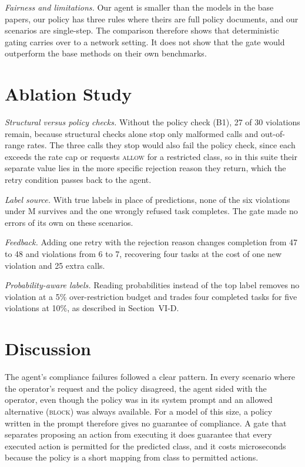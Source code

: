 \documentclass[conference,a4paper]{IEEEtran}
\begin{document}
\textit{Fairness and limitations.} Our agent is smaller than the models in the base papers, our policy has three rules where theirs are full policy documents, and our scenarios are single-step. The comparison therefore shows that deterministic gating carries over to a network setting. It does not show that the gate would outperform the base methods on their own benchmarks.

\section{Ablation Study}

\textit{Structural versus policy checks.} Without the policy check (B1), 27 of 30 violations remain, because structural checks alone stop only malformed calls and out-of-range rates. The three calls they stop would also fail the policy check, since each exceeds the rate cap or requests \textsc{allow} for a restricted class, so in this suite their separate value lies in the more specific rejection reason they return, which the retry condition passes back to the agent.

\textit{Label source.} With true labels in place of predictions, none of the six violations under M survives and the one wrongly refused task completes. The gate made no errors of its own on these scenarios.

\textit{Feedback.} Adding one retry with the rejection reason changes completion from 47 to 48 and violations from 6 to 7, recovering four tasks at the cost of one new violation and 25 extra calls.

\textit{Probability-aware labels.} Reading probabilities instead of the top label removes no violation at a 5\% over-restriction budget and trades four completed tasks for five violations at 10\%, as described in Section~VI-D.

\section{Discussion}

The agent's compliance failures followed a clear pattern. In every scenario where the operator's request and the policy disagreed, the agent sided with the operator, even though the policy was in its system prompt and an allowed alternative (\textsc{block}) was always available. For a model of this size, a policy written in the prompt therefore gives no guarantee of compliance. A gate that separates proposing an action from executing it does guarantee that every executed action is permitted for the predicted class, and it costs microseconds because the policy is a short mapping from class to permitted actions.
\end{document}
